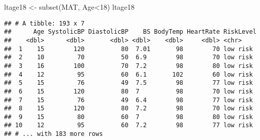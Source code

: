 \documentclass[
]{article}
\newenvironment{Shaded}{\begin{snugshade}}{\end{snugshade}}
\newcommand{\DecValTok}[1]{\textcolor[rgb]{0.00,0.00,0.81}{#1}}
\newcommand{\FunctionTok}[1]{\textcolor[rgb]{0.00,0.00,0.00}{#1}}
\newcommand{\NormalTok}[1]{#1}
\newcommand{\OtherTok}[1]{\textcolor[rgb]{0.56,0.35,0.01}{#1}}
\newcommand{\SpecialCharTok}[1]{\textcolor[rgb]{0.00,0.00,0.00}{#1}}
\newcommand{\StringTok}[1]{\textcolor[rgb]{0.31,0.60,0.02}{#1}}
\begin{document}
\begin{Shaded}
\begin{Highlighting}[]
\NormalTok{ltage18 }\OtherTok{\textless{}{-}} \FunctionTok{subset}\NormalTok{(MAT, Age}\SpecialCharTok{\textless{}}\DecValTok{18}\NormalTok{) }
\NormalTok{ltage18}
\end{Highlighting}
\end{Shaded}

\begin{verbatim}
## # A tibble: 193 x 7
##      Age SystolicBP DiastolicBP    BS BodyTemp HeartRate RiskLevel
##    <dbl>      <dbl>       <dbl> <dbl>    <dbl>     <dbl> <chr>    
##  1    15        120          80  7.01       98        70 low risk 
##  2    10         70          50  6.9        98        70 low risk 
##  3    16        100          70  7.2        98        80 low risk 
##  4    12         95          60  6.1       102        60 low risk 
##  5    15         76          49  7.5        98        77 low risk 
##  6    15        120          80  7          98        70 low risk 
##  7    15         76          49  6.4        98        77 low risk 
##  8    15        120          80  7.2        98        70 low risk 
##  9    15         80          60  7          98        80 low risk 
## 10    12         95          60  7.2        98        77 low risk 
## # ... with 183 more rows
\end{verbatim}

\begin{Shaded}
\end{Shaded}
\end{document}
